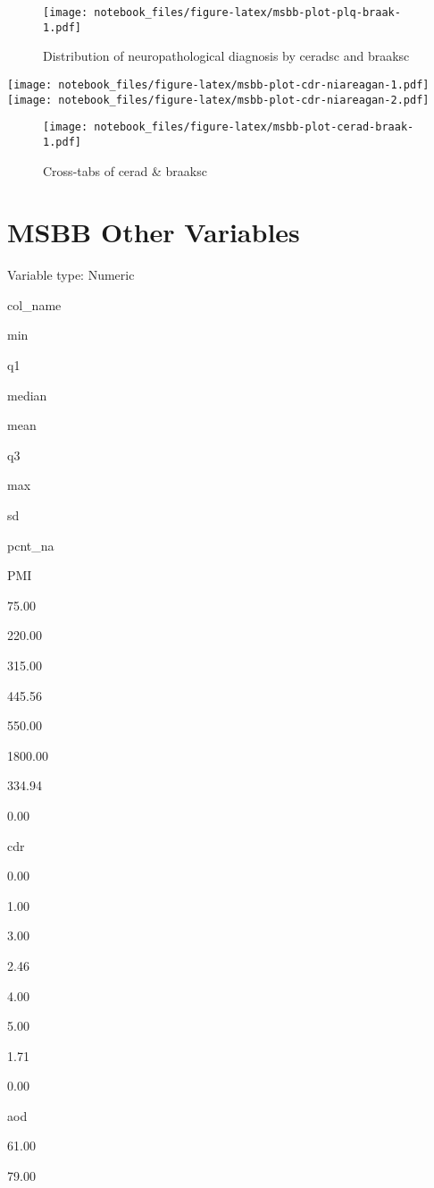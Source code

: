 \documentclass[]{book}
\begin{document}
\begin{figure}
\centering
\texttt{[image: notebook\_files/figure-latex/msbb-plot-plq-braak-1.pdf]}
\caption{\label{fig:msbb-plot-plq-braak}Distribution of neuropathological diagnosis by ceradsc and braaksc}
\end{figure}

\texttt{[image: notebook\_files/figure-latex/msbb-plot-cdr-niareagan-1.pdf]} \texttt{[image: notebook\_files/figure-latex/msbb-plot-cdr-niareagan-2.pdf]}

\begin{figure}
\centering
\texttt{[image: notebook\_files/figure-latex/msbb-plot-cerad-braak-1.pdf]}
\caption{\label{fig:msbb-plot-cerad-braak}Cross-tabs of cerad \& braaksc}
\end{figure}

\hypertarget{msbb-other-variables}{%
\section{MSBB Other Variables}\label{msbb-other-variables}}

\label{tab:msbb-numeric}Variable type: Numeric

col\_name

min

q1

median

mean

q3

max

sd

pcnt\_na

PMI

75.00

220.00

315.00

445.56

550.00

1800.00

334.94

0.00

cdr

0.00

1.00

3.00

2.46

4.00

5.00

1.71

0.00

aod

61.00

79.00
\end{document}
